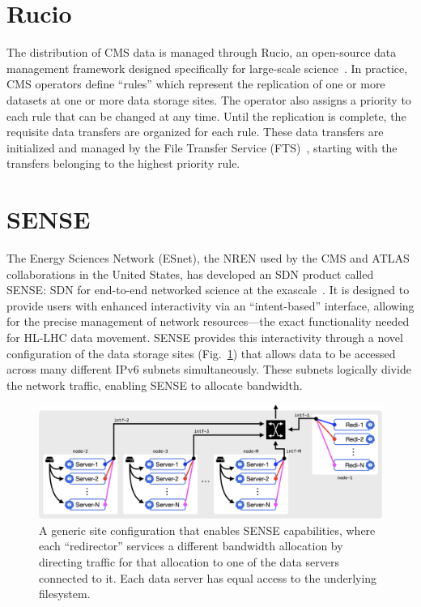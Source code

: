 \section{Rucio}
The distribution of CMS data is managed through Rucio, an open-source data management framework designed specifically for large-scale science~\cite{Rucio2019}. 
In practice, CMS operators define ``rules'' which represent the replication of one or more datasets at one or more data storage sites. 
The operator also assigns a priority to each rule that can be changed at any time. 
Until the replication is complete, the requisite data transfers are organized for each rule. 
These data transfers are initialized and managed by the File Transfer Service (FTS)~\cite{FTS3}, starting with the transfers belonging to the highest priority rule. 

\section{SENSE}
The Energy Sciences Network (ESnet), the NREN used by the CMS and ATLAS collaborations in the United States, has developed an SDN product called SENSE: SDN for end-to-end networked science at the exascale~\cite{SENSE}. 
It is designed to provide users with enhanced interactivity via an ``intent-based'' interface, allowing for the precise management of network resources---the exact functionality needed for HL-LHC data movement. 
SENSE provides this interactivity through a novel configuration of the data storage sites (Fig.~\ref{fig:sense_site}) that allows data to be accessed across many different IPv6 subnets simultaneously. 
These subnets logically divide the network traffic, enabling SENSE to allocate bandwidth. 

\begin{figure}[htb]
    \centering
    \includegraphics[width=.9\textwidth]{fig/cyber/rucio-sense_site.png}
    \caption[Rucio-SENSE site configuration.]{
        A generic site configuration that enables SENSE capabilities, where each ``redirector'' services a different bandwidth allocation by directing traffic for that allocation to one of the data servers connected to it. 
        Each data server has equal access to the underlying filesystem.
    }
    \label{fig:sense_site}
\end{figure}

